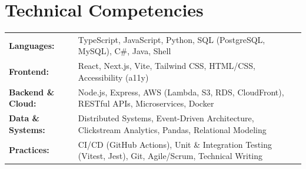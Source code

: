 \documentclass[10pt,a4paper]{article}
\begin{document}
\section{Technical Competencies}
\begingroup
\footnotesize
\begin{tabularx}{\linewidth}{@{}l X@{}}
  \textbf{Languages:} & TypeScript, JavaScript, Python, SQL (PostgreSQL, MySQL), C\#, Java, Shell \\
  \textbf{Frontend:} & React, Next.js, Vite, Tailwind CSS, HTML/CSS, Accessibility (a11y) \\
  \textbf{Backend \& Cloud:} & Node.js, Express, AWS (Lambda, S3, RDS, CloudFront), RESTful APIs, Microservices, Docker \\
  \textbf{Data \& Systems:} & Distributed Systems, Event-Driven Architecture, Clickstream Analytics, Pandas, Relational Modeling \\
  \textbf{Practices:} & CI/CD (GitHub Actions), Unit \& Integration Testing (Vitest, Jest), Git, Agile/Scrum, Technical Writing \\
\end{tabularx}
\endgroup
\end{document}
